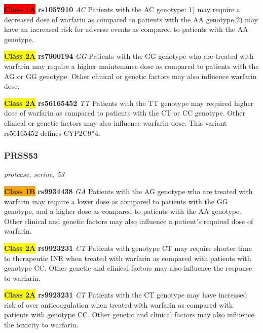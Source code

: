 \documentclass{report}
\begin{document}
\textbf{\colorbox{red} {Class 1A}} \textbf{ rs1057910 } \textit{ AC }
Patients with the AC genotype: 1) may require a decreased dose of warfarin as compared to patients with the AA genotype 2) may have an increased risk for adverse events as compared to patients with the AA genotype.\newline



\textbf{\colorbox{yellow} {Class 2A}} \textbf{ rs7900194 } \textit{ GG }
Patients with the GG genotype who are treated with warfarin may require a higher maintenance dose as compared to patients with the AG or GG genotype.  Other clinical or genetic factors may also influence warfarin dose.\newline

\textbf{\colorbox{yellow} {Class 2A}} \textbf{ rs56165452 } \textit{ TT }
Patients with the TT genotype may required higher dose of warfarin as compared to patients with the CT or CC genotype. Other clinical or genetic factors may also influence  warfarin dose. This variant rs56165452 defines CYP2C9*4.\newline

\subsubsection{ PRSS53 }
\textit{ protease, serine, 53 } \newline



\textbf{\colorbox{orange} {Class 1B}} \textbf{ rs9934438 } \textit{ GA }
Patients with the AG genotype who are treated with warfarin may require a lower dose as compared to patients with the GG genotype, and a higher dose as compared to patients with the AA genotype. Other clinical and genetic factors may also influence a patient’s required dose of warfarin. \newline


\textbf{\colorbox{yellow} {Class 2A}} \textbf{ rs9923231 } \textit{ CT }
Patients with genotype CT may require shorter time to therapeutic INR when treated with warfarin as compared with patients with genotype CC. Other genetic and clinical factors may also influence the response to warfarin. \newline

\textbf{\colorbox{yellow} {Class 2A}} \textbf{ rs9923231 } \textit{ CT }
Patients with the CT genotype may have increased risk of over-anticoagulation when treated with warfarin as compared with patients with genotype CC. Other genetic and clinical factors may also influence the toxicity to warfarin.\newline
\end{document}
